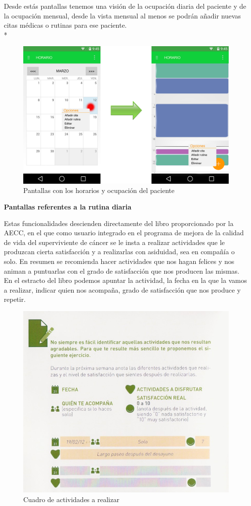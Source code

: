 \documentclass[../pfc.tex]{subfiles}
\begin{document}
		
		Desde estás pantallas tenemos una visión de la ocupación diaria del paciente y de la ocupación mensual, desde la vista mensual al menos se podrán añadir nuevas citas médicas o rutinas para ese paciente.\\*

		
		\begin{figure}[H]
			\centering
			\includegraphics[width=0.7\linewidth]{../images/horario_2}
			\caption[Horario de actividades]{Pantallas con los horarios y ocupación del paciente}
			\label{fig:horario_2}
		\end{figure}
		
		
		\textbf{Pantallas referentes a la rutina diaria}
		
		Estas funcionalidades descienden directamente del libro proporcionado por la AECC, en el que como usuario integrado en el programa de mejora de la calidad de vida del superviviente de cáncer se le insta a realizar actividades que le produzcan cierta satisfacción y a realizarlas con asiduidad, sea en compañía o solo. En resumen se recomienda hacer actividades que nos hagan felices y nos animan a puntuarlas con el grado de satisfacción que nos producen las mismas. En el estracto del libro podemos apuntar la actividad, la fecha en la que la vamos a realizar, indicar quien nos acompaña, grado de satisfacción que nos produce y repetir.
		
		
		
		\begin{figure}[H]
			\centering
			\includegraphics[width=0.7\linewidth]{../folleto/006_corto}
			\caption{Cuadro de actividades a realizar}
			\label{fig:006}
		\end{figure}
\end{document}
